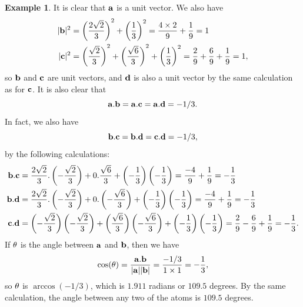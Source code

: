 \documentclass[reqno]{amsart}
\theoremstyle{definition}
\newtheorem{example}[theorem]{Example}
\begin{document}
\begin{example}
 It is clear that $\mathbf{a}$ is a unit vector.  We also have
 \begin{align*}
  |\mathbf{b}|^2 &= \left(\frac{2\sqrt{2}}{3}\right)^2 + 
             \left(\frac{1}{3}\right)^2 = 
             \frac{4\times 2}{9} + \frac{1}{9} = 1 \\
  |\mathbf{c}|^2 &= \left(\frac{\sqrt{2}}{3}\right)^2 + 
             \left(\frac{\sqrt{6}}{3}\right)^2 + 
             \left(\frac{1}{3}\right)^2 =
             \frac{2}{9} + \frac{6}{9} + \frac{1}{9} = 1,
 \end{align*}
 so $\mathbf{b}$ and $\mathbf{c}$ are unit vectors, and $\mathbf{d}$ is also a unit vector
 by the same calculation as for $\mathbf{c}$.  It is also clear that
 \[ \mathbf{a}.\mathbf{b} = \mathbf{a}.\mathbf{c} = \mathbf{a}.\mathbf{d} = -1/3. \]
 In fact, we also have
 \[ \mathbf{b}.\mathbf{c} = \mathbf{b}.\mathbf{d} = \mathbf{c}.\mathbf{d} = -1/3, \]
 by the following calculations:
 \begin{align*}
  \mathbf{b}.\mathbf{c} &= \frac{2\sqrt{2}}{3}.\left(-\frac{\sqrt{2}}{3}\right) +
              0.\frac{\sqrt{6}}{3} + 
             \left(-\frac{1}{3}\right)\left(-\frac{1}{3}\right) 
           = \frac{-4}{9} + \frac{1}{9} = -\frac{1}{3} \\
  \mathbf{b}.\mathbf{d} &= \frac{2\sqrt{2}}{3}.\left(-\frac{\sqrt{2}}{3}\right) +
              0.\left(-\frac{\sqrt{6}}{3}\right) + 
             \left(-\frac{1}{3}\right)\left(-\frac{1}{3}\right) 
           = \frac{-4}{9} + \frac{1}{9} = -\frac{1}{3} \\
  \mathbf{c}.\mathbf{d} &= \left(-\frac{\sqrt{2}}{3}\right)\left(-\frac{\sqrt{2}}{3}\right) + 
             \left(\frac{\sqrt{6}}{3}\right)\left(-\frac{\sqrt{6}}{3}\right) + 
             \left(-\frac{1}{3}\right)\left(-\frac{1}{3}\right) 
           = \frac{2}{9} - \frac{6}{9} + \frac{1}{9} = -\frac{1}{3}.
 \end{align*}
 If $\theta$ is the angle between $\mathbf{a}$ and $\mathbf{b}$, then we have
 \[ \cos(\theta) = \frac{\mathbf{a}.\mathbf{b}}{|\mathbf{a}||\mathbf{b}|} = \frac{-1/3}{1\times 1} =
     -\frac{1}{3},
 \]
 so $\theta$ is $\arccos(-1/3)$, which is $1.911$ radians or $109.5$
 degrees.  By the same calculation, the angle between any two of the
 atoms is $109.5$ degrees.
\end{example}
\end{document}
